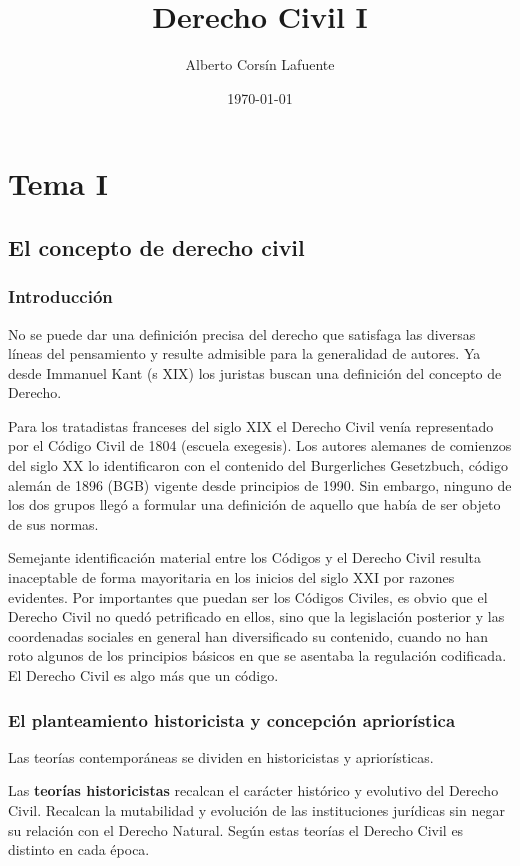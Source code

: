 \documentclass[a4paper,12pt]{report}
\begin{document}
\title{Derecho Civil I}
\author{Alberto Corsín Lafuente}
\date{\today}
\maketitle
\tableofcontents
\chapter{Tema I}
\section{El concepto de derecho civil}
\subsection{Introducción}

No se puede dar una definición precisa del derecho que satisfaga las diversas
líneas del pensamiento y resulte admisible para la generalidad de autores. Ya
desde Immanuel Kant (s XIX) los juristas buscan una definición del concepto de
Derecho.

Para los tratadistas franceses del siglo XIX el Derecho Civil venía representado
por el Código Civil de 1804 (escuela exegesis). Los autores alemanes de
comienzos del siglo XX lo identificaron con el contenido del Burgerliches
Gesetzbuch, código alemán de 1896 (BGB) vigente desde principios de 1990. Sin
embargo, ninguno de los dos grupos llegó a formular una definición de aquello
que había de ser objeto de sus normas.

Semejante identificación material entre los Códigos y el Derecho Civil resulta
inaceptable de forma mayoritaria en los inicios del siglo XXI por razones
evidentes. Por importantes que puedan ser los Códigos Civiles, es obvio que el
Derecho Civil no quedó petrificado en ellos, sino que la legislación posterior y
las coordenadas sociales en general han diversificado su contenido, cuando no
han roto algunos de los principios básicos en que se asentaba la regulación
codificada. El Derecho Civil es algo más que un código.

\subsection{El planteamiento historicista y concepción apriorística}

Las teorías contemporáneas se dividen en historicistas y apriorísticas.

Las \textbf{teorías historicistas} recalcan el carácter histórico y evolutivo
del Derecho Civil. Recalcan la mutabilidad y evolución de las instituciones
jurídicas sin negar su relación con el Derecho Natural. Según estas teorías el
Derecho Civil es distinto en cada época.
\end{document}
